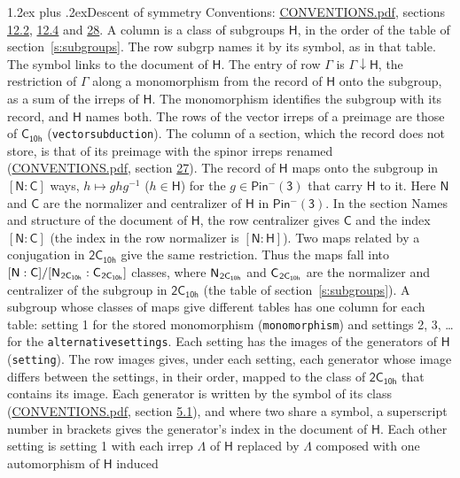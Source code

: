 \documentclass[10pt,a4paper]{article}
\makeatletter
\renewcommand\section{\@startsection{section}{1}{\z@}{-3ex plus -1ex minus -.2ex}%
  {1.2ex plus .2ex}{\normalfont\large\sffamily\bfseries\color{parttitle}}}
\numberwithin{equation}{section}
\newcommand{\grp}[1]{\mathsf{#1}}
\newcommand{\grpindex}[2]{[#1 : #2]}
\newcommand{\restr}[2]{#1\!\downarrow#2}
\newcommand{\hairsp}{\mkern1mu}
\makeatother
\begin{document}
\section{Descent of symmetry}\label{s:subduction}
Conventions: \href{../../CONVENTIONS.pdf}{CONVENTIONS.pdf}, sections \href{../../../rotation/CONVENTIONS.pdf\#conv.12.2}{12.2}, \href{../../../rotation/CONVENTIONS.pdf\#conv.12.4}{12.4} and \href{../../CONVENTIONS.pdf\#conv.28}{28}.
A column is a class of subgroups $\grp{H}$, in the order of the table of section~\ref{s:subgroups}. The row subgrp names it by its symbol, as in that table. The symbol links to the document of $\grp{H}$. The entry of row $\Gamma$ is $\restr{\Gamma}{\grp{H}}$, the restriction of $\Gamma$ along a monomorphism from the record of $\grp{H}$ onto the subgroup, as a sum of the irreps of $\grp{H}$. The monomorphism identifies the subgroup with its record, and $\grp{H}$ names both. The rows of the vector irreps of a preimage are those of \href{../../../rotation/data/pdf/C10h.pdf}{$\grp{C_{10h}}$} (\texttt{vectorsubduction}). The column of a section, which the record does not store, is that of its preimage with the spinor irreps renamed (\href{../../CONVENTIONS.pdf}{CONVENTIONS.pdf}, section \href{../../CONVENTIONS.pdf\#conv.27}{27}). \label{n:group.normalizer.o3}\label{n:group.centralizer.o3}\label{n:element.h}The record of $\grp{H}$ maps onto the subgroup in $\grpindex{\grp{N}}{\grp{C}}$ ways, $h \mapsto g h g^{-1}$ ($h \in \grp{H}$) for the $g \in \grp{Pin^{-}(3)}$ that carry $\grp{H}$ to it. Here $\grp{N}$ and $\grp{C}$ are the normalizer and centralizer of $\grp{H}$ in \href{Pinminus3.pdf}{$\grp{Pin^{-}(3)}$}. In the section Names and structure of the document of $\grp{H}$, the row centralizer gives $\grp{C}$ and the index $\grpindex{\grp{N}}{\grp{C}}$ (the index in the row normalizer is $\grpindex{\grp{N}}{\grp{H}}$). Two maps related by a conjugation in $\grp{2C_{10h}}$ give the same restriction. Thus the maps fall into $\grpindex{\grp{N}}{\grp{C}}/\grpindex{\grp{N}_{\hairsp \grp{2C_{10h}}}}{\grp{C}_{\hairsp \grp{2C_{10h}}}}$ classes, where $\grp{N}_{\hairsp \grp{2C_{10h}}}$ and $\grp{C}_{\hairsp \grp{2C_{10h}}}$ are the normalizer and centralizer of the subgroup in $\grp{2C_{10h}}$ (the table of section~\ref{s:subgroups}). \label{n:head.setting}A subgroup whose classes of maps give different tables has one column for each table: setting 1 for the stored monomorphism (\texttt{monomorphism}) and settings 2, 3, \dots{} for the \texttt{alternativesettings}. Each setting has the images of the generators of $\grp{H}$ (\texttt{setting}). \label{n:head.images}The row images gives, under each setting, each generator whose image differs between the settings, in their order, mapped to the class of $\grp{2C_{10h}}$ that contains its image. Each generator is written by the symbol of its class (\href{../../CONVENTIONS.pdf}{CONVENTIONS.pdf}, section \href{../../../rotation/CONVENTIONS.pdf\#conv.5.1}{5.1}), and where two share a symbol, a superscript number in brackets gives the generator's index in the document of $\grp{H}$. \label{n:irrep.Delta}Each other setting is setting 1 with each irrep $\Lambda$ of $\grp{H}$ replaced by $\Lambda$ composed with one automorphism of $\grp{H}$ induced 
\end{document}
